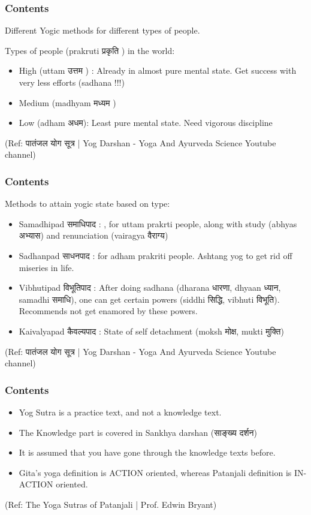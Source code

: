 \begin{frame}[fragile]\frametitle{Contents}

Different Yogic methods for different types of people.

Types of people (prakruti प्रकृति ) in the world:

	\begin{itemize}
	\item High (uttam उत्तम ) : Already in almost pure mental state. Get success with very less efforts (sadhana !!!) 
	\item Medium (madhyam मध्यम )
	\item Low (adham अधम): Least pure mental state. Need vigorous discipline
	\end{itemize}
	
\tiny{(Ref: पातंजल योग सूत्र | Yog Darshan - Yoga And Ayurveda Science Youtube channel)}

\end{frame}

\begin{frame}[fragile]\frametitle{Contents}

Methods to attain yogic state based on type:


	\begin{itemize}
	\item Samadhipad समाधिपाद : , for uttam prakrti people, along with study (abhyas अभ्यास) and renunciation (vairagya वैराग्य)
	\item Sadhanpad साधनपाद : for adham prakriti people. Ashtang yog to get rid off miseries in life.
	\item Vibhutipad विभूतिपाद : After doing sadhana (dharana धारणा, dhyaan ध्यान, samadhi समाधि), one can get certain powers (siddhi सिद्धि, vibhuti विभूति). Recommends not get enamored by these powers.
	\item Kaivalyapad कैवल्यपाद : State of self detachment (moksh मोक्ष, mukti मुक्ति)
	\end{itemize}	

\tiny{(Ref: पातंजल योग सूत्र | Yog Darshan - Yoga And Ayurveda Science Youtube channel)}

\end{frame}


\begin{frame}[fragile]\frametitle{Contents}
	\begin{itemize}
	\item Yog Sutra is a practice text, and not a knowledge text.
	\item The Knowledge part is covered in Sankhya darshan (साङ्ख्य दर्शन)
	\item It is assumed that you have gone through the knowledge texts before.
	\item Gita's yoga definition is ACTION oriented, whereas Patanjali definition is IN-ACTION oriented.
	\end{itemize}

\tiny{(Ref: The Yoga Sutras of Patanjali | Prof. Edwin Bryant)}

\end{frame}

